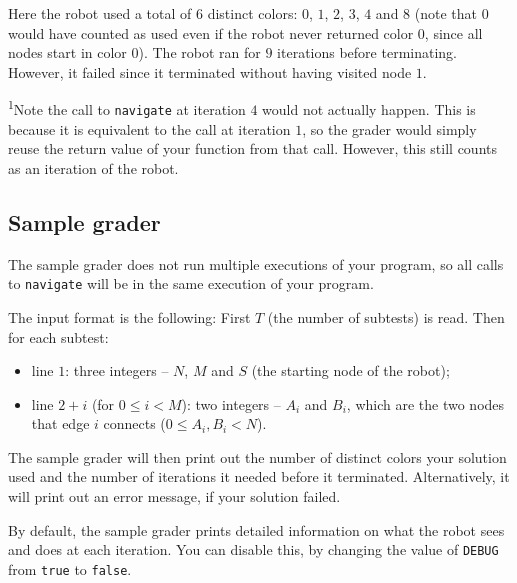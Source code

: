 \documentclass[12pt]{article}
\begin{document}
Here the robot used a total of $6$ distinct colors: $0$, $1$, $2$, $3$, $4$ and $8$ (note that $0$ would have counted as used even if the robot never returned color $0$, since all nodes start in color $0$). The robot ran for $9$ iterations before terminating. However, it failed since it terminated without having visited node $1$.

\textsuperscript{1}Note the call to \texttt{navigate} at iteration $4$ would not actually happen. This is because it is equivalent to the call at iteration $1$, so the grader would simply reuse the return value of your function from that call. However, this still counts as an iteration of the robot.

\subsection{Sample grader}

The sample grader does not run multiple executions of your program, so all calls to \texttt{navigate} will be in the same execution of your program.

The input format is the following: First $T$ (the number of subtests) is read. Then for each subtest:
\begin{itemize}
\item line $1$: three integers -- $N$, $M$ and $S$ (the starting node of the robot);
\item line $2+i$ (for $0 \leq i < M$): two integers -- $A_i$ and $B_i$, which are the two nodes that edge $i$ connects ($0 \leq A_i, B_i < N$).
\end{itemize}

The sample grader will then print out the number of distinct colors your solution used and the number of iterations it needed before it terminated. Alternatively, it will print out an error message, if your solution failed.

By default, the sample grader prints detailed information on what the robot sees and does at each iteration. You can disable this, by changing the value of \texttt{DEBUG} from \texttt{true} to \texttt{false}.
\end{document}
